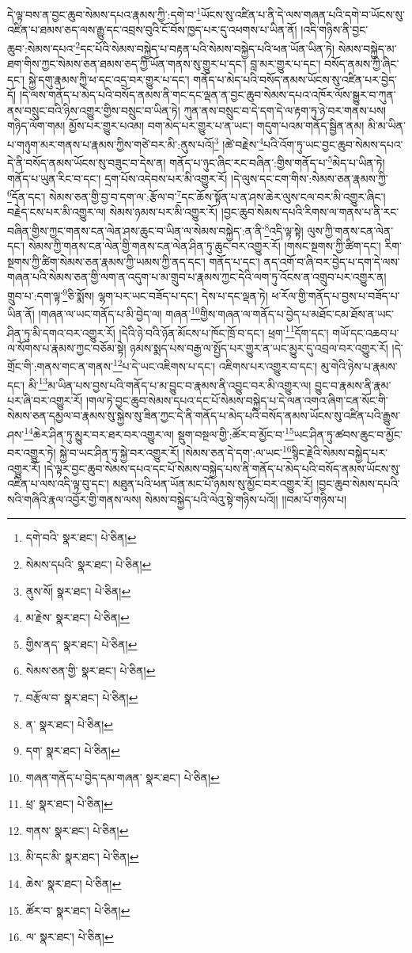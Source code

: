 དེ་ལྟ་བས་ན་བྱང་ཆུབ་སེམས་དཔའ་རྣམས་ཀྱི་:དགེ་བ་\footnote{དགེ་བའི་  སྣར་ཐང་།  པེ་ཅིན། }ཡོངས་སུ་འཛིན་པ་ནི་དེ་ལས་གཞན་པའི་དགེ་བ་ཡོངས་སུ་འཛིན་པ་ཐམས་ཅད་ལས་རྒྱུ་དང་འབྲས་བུའི་ངོ་བོས་ཁྱད་པར་དུ་འཕགས་པ་ཡིན་ནོ། །འདི་གཉིས་ནི་བྱང་ཆུབ་:སེམས་དཔའ་\footnote{སེམས་དཔའི་  སྣར་ཐང་།  པེ་ཅིན། }དང་པོའི་སེམས་བསྐྱེད་པ་བརྟན་པའི་སེམས་བསྐྱེད་པའི་ཕན་ཡོན་ཡིན་ཏེ། སེམས་བསྐྱེད་མ་ཐག་གིས་ཀྱང་སེམས་ཅན་ཐམས་ཅད་ཀྱི་ཡོན་གནས་སུ་གྱུར་པ་དང་། བླ་མར་གྱུར་པ་དང་། བསོད་ནམས་ཀྱི་ཞིང་དང་། སྐྱེ་དགུ་རྣམས་ཀྱི་ཕ་དང་འདྲ་བར་གྱུར་པ་དང་། གནོད་པ་མེད་པའི་བསོད་ནམས་ཡོངས་སུ་འཛིན་པར་བྱེད་དོ། །དེ་ལས་གནོད་པ་མེད་པའི་བསོད་ནམས་ནི་གང་དང་ལྡན་ན་བྱང་ཆུབ་སེམས་དཔའ་འཁོར་ལོས་སྒྱུར་བ་ཀུན་ནས་བསྲུང་བའི་ཉིས་འགྱུར་གྱིས་བསྲུང་བ་ཡིན་ཏེ། ཀུན་ནས་བསྲུང་བ་དེ་དག་དེ་ལ་རྟག་ཏུ་ཉེ་བར་གནས་པས། གཉིད་ལོག་གམ། མྱོས་པར་གྱུར་པའམ། བག་མེད་པར་གྱུར་པ་ན་ཡང་། གདུག་པའམ་གནོད་སྦྱིན་ནམ། མི་མ་ཡིན་པ་གཉུག་མར་གནས་པ་རྣམས་ཀྱིས་གཙེ་བར་མི་:ནུས་པའོ།\footnote{ནུས་སོ།  སྣར་ཐང་།  པེ་ཅིན། } །ཚེ་བརྗེས་\footnote{མ་རྗེས་  སྣར་ཐང་།  པེ་ཅིན། }པའི་འོག་ཏུ་ཡང་བྱང་ཆུབ་སེམས་དཔའ་དེ་ནི་བསོད་ནམས་ཡོངས་སུ་བཟུང་བ་དེས་ན། གནོད་པ་ཉུང་ཞིང་རང་བཞིན་:གྱིས་གནོད་པ་\footnote{གྱིས་ནད་  སྣར་ཐང་།  པེ་ཅིན། }མེད་པ་ཡིན་ཏེ། གནོད་པ་ཡུན་རིང་བ་དང་། དྲག་པོས་འདེབས་པར་མི་འགྱུར་རོ། །དེ་ལུས་དང་ངག་གིས་:སེམས་ཅན་རྣམས་ཀྱི་\footnote{སེམས་ཅན་གྱི་  སྣར་ཐང་།  པེ་ཅིན། }དོན་དང་། སེམས་ཅན་གྱི་བྱ་བ་དག་ལ་:རྩོལ་བ་\footnote{བརྩོལ་བ་  སྣར་ཐང་།  པེ་ཅིན། }དང་ཆོས་སྟོན་པ་ན་ཤས་ཆེར་ལུས་ངལ་བར་མི་འགྱུར་ཞིང་། བརྗེད་ངས་པར་མི་འགྱུར་ལ། སེམས་ཉམས་པར་མི་འགྱུར་རོ། །བྱང་ཆུབ་སེམས་དཔའི་རིགས་ལ་གནས་པ་ནི་རང་བཞིན་གྱིས་ཀྱང་གནས་ངན་ལེན་ཤས་ཆུང་བ་ཡིན་ལ་སེམས་བསྐྱེད་:ན་ནི་\footnote{ན་  སྣར་ཐང་།  པེ་ཅིན། }འདི་ལྟ་སྟེ། ལུས་ཀྱི་གནས་ངན་ལེན་དང་། སེམས་ཀྱི་གནས་ངན་ལེན་གྱི་གནས་ངན་ལེན་ཤིན་ཏུ་ཆུང་བར་འགྱུར་རོ། །གསང་སྔགས་ཀྱི་ཚིག་དང་། རིག་སྔགས་ཀྱི་ཚིག་སེམས་ཅན་རྣམས་ཀྱི་ཡམས་ཀྱི་ནད་དང་། གནོད་པ་དང་། ནད་འགོ་བ་ཞི་བར་བྱེད་པ་དག་དེ་ལས་གཞན་པའི་སེམས་ཅན་གྱི་ལག་ན་འདུག་པ་མ་གྲུབ་པ་རྣམས་ཀྱང་དེའི་ལག་ཏུ་འོངས་ན་འགྲུབ་པར་འགྱུར་ན། གྲུབ་པ་:དག་ལྟ་\footnote{དག་  སྣར་ཐང་།  པེ་ཅིན། }ཅི་སྨོས། ལྷག་པར་ཡང་བཟོད་པ་དང་། དེས་པ་དང་ལྡན་ཏེ། ཕ་རོལ་གྱི་གནོད་པ་བྱས་པ་བཟོད་པ་ཡིན་ནོ། །གཞན་ལ་ཡང་གནོད་པ་མི་བྱེད་ལ། གཞན་\footnote{གཞན་གནོད་པ་བྱེད་དམ་གཞན་  སྣར་ཐང་།  པེ་ཅིན། }གྱིས་གཞན་ལ་གནོད་པ་བྱེད་པ་མཐོང་ངམ་ཐོས་ན་ཡང་ཤིན་ཏུ་མི་དགའ་བར་འགྱུར་རོ། །དེའི་ཉེ་བའི་ཉོན་མོངས་པ་ཁོང་ཁྲོ་བ་དང་། ཕྲག་\footnote{ཕྲ་  སྣར་ཐང་།  པེ་ཅིན། }དོག་དང་། གཡོ་དང་འཆབ་པ་ལ་སོགས་པ་རྣམས་ཀྱང་བཅོམ་སྟེ། ཉམས་སྨད་པས་བརྒྱ་ལ་སྤྱོད་པར་གྱུར་ན་ཡང་མྱུར་དུ་འབྲལ་བར་འགྱུར་རོ། །དེ་གྲོང་གི་:གནས་གང་ན་གནས་\footnote{གནས་  སྣར་ཐང་།  པེ་ཅིན། }པ་དེ་ཡང་འཇིགས་པ་དང་། འཇིགས་པར་འགྱུར་བ་དང་། མུ་གེའི་ཉེས་པ་རྣམས་དང་། མི་\footnote{མི་དང་མི་  སྣར་ཐང་།  པེ་ཅིན། }མ་ཡིན་པས་བྱས་པའི་གནོད་པ་མ་བྱུང་བ་རྣམས་ནི་འབྱུང་བར་མི་འགྱུར་ལ། བྱུང་བ་རྣམས་ནི་རྣམ་པར་ཞི་བར་འགྱུར་རོ། །གལ་ཏེ་བྱང་ཆུབ་སེམས་དཔའ་དང་པོ་སེམས་བསྐྱེད་པ་དེ་ལན་འགའ་ཞིག་ངན་སོང་གི་སེམས་ཅན་དམྱལ་བ་རྣམས་སུ་སྐྱེས་སུ་ཟིན་ཀྱང་དེ་ནི་གནོད་པ་མེད་པའི་བསོད་ནམས་ཡོངས་སུ་འཛིན་པའི་རྒྱུས་ཤས་\footnote{ཆེས་  སྣར་ཐང་།  པེ་ཅིན། }ཆེར་ཤིན་ཏུ་མྱུར་བར་ཐར་བར་འགྱུར་ལ། སྡུག་བསྔལ་གྱི་:ཚོར་བ་མྱོང་བ་\footnote{ཚོར་བ་  སྣར་ཐང་།  པེ་ཅིན། }ཡང་ཤིན་ཏུ་ཚབས་ཆུང་བ་མྱོང་བར་འགྱུར་ཏེ། སྐྱེ་བ་ཡང་ཤིན་ཏུ་སྐྱེ་བར་འགྱུར་རོ། །སེམས་ཅན་དེ་དག་:ལ་ཡང་\footnote{ལ་  སྣར་ཐང་།  པེ་ཅིན། }སྙིང་རྗེའི་སེམས་བསྐྱེད་པར་འགྱུར་རོ། །དེ་ལྟར་བྱང་ཆུབ་སེམས་དཔའ་དང་པོ་སེམས་བསྐྱེད་པས་ནི་གནོད་པ་མེད་པའི་བསོད་ནམས་ཡོངས་སུ་འཛིན་པ་ལས་འདི་ལྟ་བུ་དང་། མཐུན་པའི་ཕན་ཡོན་མང་པོ་ཉམས་སུ་མྱོང་བར་འགྱུར་རོ། །བྱང་ཆུབ་སེམས་དཔའི་སའི་གཞིའི་རྣལ་འབྱོར་གྱི་གནས་ལས། སེམས་བསྐྱེད་པའི་ལེའུ་སྟེ་གཉིས་པའོ།། །།བམ་པོ་གཉིས་པ། 